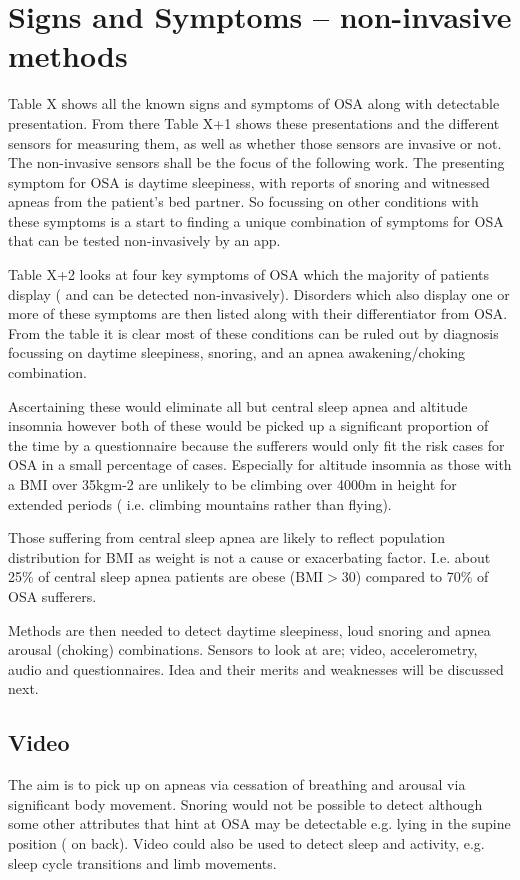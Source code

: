 \section{Signs and Symptoms -- non-invasive methods}
\label{sec:signsAndSymptoms-sophie}
Table X shows all the known signs and symptoms of OSA along with detectable presentation. From there Table X+1 shows these presentations and the different sensors for measuring them, as well as whether those sensors are invasive or not. The non-invasive sensors shall be the focus of the following work. The presenting symptom for OSA is daytime sleepiness, with reports of snoring and witnessed apneas from the patient’s bed partner. So focussing on other conditions with these symptoms is a start to finding a unique combination of symptoms for OSA that can be tested non-invasively by an app. 

Table X+2 looks at four key symptoms of OSA which the majority of patients display ( and can be detected non-invasively). Disorders which also display one or more of these symptoms are then listed along with their differentiator from OSA. From the table it is clear most of these conditions can be ruled out by diagnosis focussing on daytime sleepiness, snoring, and an apnea awakening/choking combination. 

Ascertaining these would eliminate all but central sleep apnea and altitude insomnia however both of these would be picked up a significant proportion of the time by a questionnaire because the sufferers would only fit the risk cases for OSA in a small percentage of cases. Especially for altitude insomnia as those with a BMI over 35kgm-2 are unlikely to be climbing over 4000m in height for extended periods ( i.e. climbing mountains rather than flying).

Those suffering from central sleep apnea are likely to reflect population distribution for BMI as weight is not a cause or exacerbating factor. I.e. about 25\% of central sleep apnea patients are obese ($\text{BMI} > 30$) compared to 70\% of OSA sufferers.

Methods are then needed to detect daytime sleepiness, loud snoring and apnea arousal (choking) combinations. Sensors to look at are; video, accelerometry, audio and questionnaires. Idea and their merits and weaknesses will be discussed next.

\subsection{Video}
The aim is to pick up on apneas via cessation of breathing and arousal via significant body movement. Snoring would not be possible to detect although some other attributes that hint at OSA may be detectable e.g. lying in the supine position ( on back). Video could also be used to detect sleep and activity, e.g. sleep cycle transitions and limb movements. 


